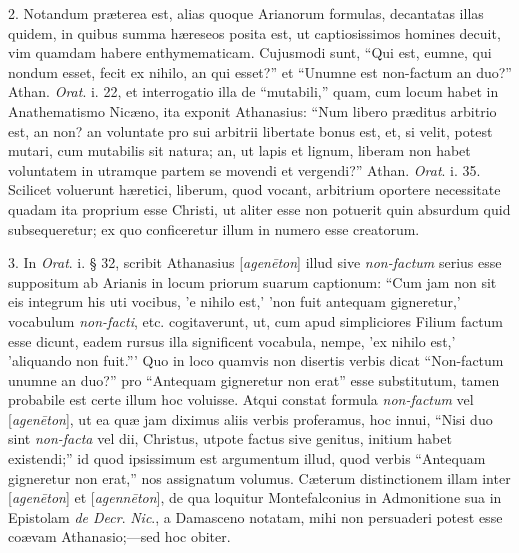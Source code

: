 2. Notandum
præterea est, alias quoque Arianorum formulas, decantatas illas
quidem, in quibus summa hæreseos posita est, ut captiosissimos
homines decuit, vim quamdam habere enthymematicam. Cujusmodi sunt, ``Qui
est, eumne, qui nondum esset, fecit ex nihilo, an qui esset?''
et ``Unumne est non-factum an duo?'' Athan. \emph{Orat}. i. 22, et
interrogatio illa de ``mutabili,'' quam, cum locum habet in
Anathematismo Nicæno, ita exponit Athanasius: ``Num libero præditus
arbitrio est, an non? an voluntate pro sui arbitrii libertate bonus
est, et, si velit, potest mutari, cum mutabilis sit natura; an, ut
lapis et lignum, liberam non habet voluntatem in utramque partem se
movendi et vergendi?'' Athan. \emph{Orat}. i. 35. Scilicet voluerunt
hæretici, liberum, quod vocant, arbitrium oportere necessitate quadam
ita proprium esse Christi, ut aliter esse non potuerit quin absurdum
quid subsequeretur; ex quo conficeretur illum in numero esse creatorum.

3. In \emph{Orat}.
i. § 32, scribit Athanasius [\emph{agen\={e}ton}] illud sive \emph{non-factum}
serius esse suppositum ab Arianis in locum priorum suarum captionum: ``Cum jam non sit eis integrum his uti vocibus, 'e nihilo est,' 'non
fuit antequam gigneretur,' vocabulum \emph{non-facti}, etc.
cogitaverunt, ut, cum apud simpliciores Filium factum esse dicunt,
eadem rursus illa significent vocabula, nempe, 'ex nihilo est,' 'aliquando
non fuit.''' Quo in loco quamvis non disertis verbis dicat ``Non-factum unumne an duo?'' pro
``Antequam gigneretur non
erat'' esse substitutum, tamen probabile est certe illum hoc voluisse.
Atqui constat formula \emph{non-factum} vel [\emph{agen\={e}ton}],
ut ea quæ jam diximus aliis verbis proferamus, hoc innui, ``Nisi duo
sint \emph{non-facta} vel dii, Christus, utpote factus sive genitus,
initium habet existendi;'' id quod ipsissimum est argumentum illud,
quod verbis ``Antequam gigneretur non erat,'' nos assignatum volumus.
Cæterum distinctionem illam inter [\emph{agen\={e}ton}] et [\emph{agenn\={e}ton}],
de qua loquitur Montefalconius in Admonitione sua in Epistolam \emph{de
Decr}. \emph{Nic}., a Damasceno notatam, mihi non persuaderi potest
esse coævam Athanasio;—sed hoc obiter.

